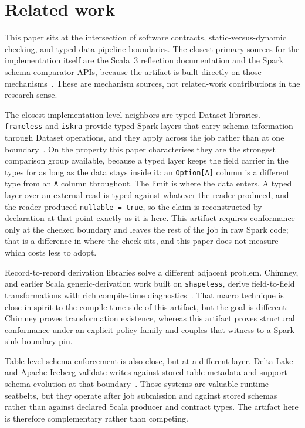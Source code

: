 \section{Related work}

This paper sits at the intersection of software contracts, static-versus-dynamic checking, and typed data-pipeline boundaries. The closest primary sources for the implementation itself are the Scala~3 reflection documentation and the Spark schema-comparator APIs, because the artifact is built directly on those mechanisms~\cite{scala3_reflection,spark_datatype}. These are mechanism sources, not related-work contributions in the research sense.

The closest implementation-level neighbors are typed-Dataset libraries. \texttt{frameless} and \texttt{iskra} provide typed Spark layers that carry schema information through Dataset operations, and they apply across the job rather than at one boundary~\cite{frameless,iskra}. On the property this paper characterises they are the strongest comparison group available, because a typed layer keeps the field carrier in the types for as long as the data stays inside it: an \texttt{Option[A]} column is a different type from an \texttt{A} column throughout. The limit is where the data enters. A typed layer over an external read is typed against whatever the reader produced, and the reader produced \texttt{nullable = true}, so the claim is reconstructed by declaration at that point exactly as it is here. This artifact requires conformance only at the checked boundary and leaves the rest of the job in raw Spark code; that is a difference in where the check sits, and this paper does not measure which costs less to adopt.

Record-to-record derivation libraries solve a different adjacent problem. Chimney, and earlier Scala generic-derivation work built on \texttt{shapeless}, derive field-to-field transformations with rich compile-time diagnostics~\cite{chimney,shapeless}. That macro technique is close in spirit to the compile-time side of this artifact, but the goal is different: Chimney proves transformation existence, whereas this artifact proves structural conformance under an explicit policy family and couples that witness to a Spark sink-boundary pin.

Table-level schema enforcement is also close, but at a different layer. Delta Lake and Apache Iceberg validate writes against stored table metadata and support schema evolution at that boundary~\cite{delta_lake,apache_iceberg}. Those systems are valuable runtime seatbelts, but they operate after job submission and against stored schemas rather than against declared Scala producer and contract types. The artifact here is therefore complementary rather than competing.

